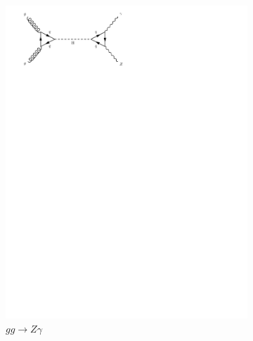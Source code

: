 \begin{figure}[h]
\begin{subfigure}[b]{0.3\textwidth}
    \includegraphics[trim={0.5cm 22cm 10cm 0cm},width=\textwidth]{../Diagrams/D17.pdf}
    \caption{$gg \rightarrow Z\gamma$}
    \label{fey:17}
  \end{subfigure}%
  ~
  \begin{subfigure}[b]{0.3\textwidth}

\end{subfigure}
\end{figure}
